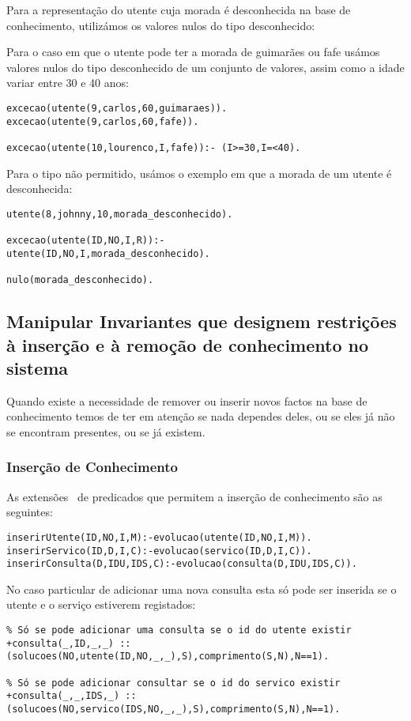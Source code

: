 Para a representação do utente cuja morada é desconhecida na base de conhecimento, utilizámos os valores nulos do tipo desconhecido: 



Para o caso em que o utente pode ter a morada de guimarães ou fafe  usámos valores nulos do tipo desconhecido de um conjunto de valores, assim como a idade variar entre 30 e 40 anos: 

\begin{Verbatim}
excecao(utente(9,carlos,60,guimaraes)).
excecao(utente(9,carlos,60,fafe)).

excecao(utente(10,lourenco,I,fafe)):- (I>=30,I=<40).	
\end{Verbatim}

Para o tipo não permitido, usámos o exemplo em que a morada de um utente é desconhecida: 

\begin{verbatim}
utente(8,johnny,10,morada_desconhecido).

excecao(utente(ID,NO,I,R)):- 
utente(ID,NO,I,morada_desconhecido).

nulo(morada_desconhecido).
\end{verbatim}


\subsection{Manipular Invariantes que designem restrições à inserção e à remoção de conhecimento no sistema}

Quando existe a necessidade de remover ou inserir novos factos na base de conhecimento temos de ter em atenção se nada dependes deles, ou se eles já não se encontram presentes, ou se já existem. 

\subsubsection{Inserção de Conhecimento}
As extensões ~de predicados que permitem a inserção de conhecimento são as seguintes: 
\begin{verbatim}
inserirUtente(ID,NO,I,M):-evolucao(utente(ID,NO,I,M)).
inserirServico(ID,D,I,C):-evolucao(servico(ID,D,I,C)).
inserirConsulta(D,IDU,IDS,C):-evolucao(consulta(D,IDU,IDS,C)).
\end{verbatim}
No caso particular de adicionar uma nova consulta esta só pode ser inserida se o utente e o serviço estiverem registados: 
\begin{verbatim}
% Só se pode adicionar uma consulta se o id do utente existir 
+consulta(_,ID,_,_) ::
(solucoes(NO,utente(ID,NO,_,_),S),comprimento(S,N),N==1).

% Só se pode adicionar consultar se o id do servico existir
+consulta(_,_,IDS,_) ::
(solucoes(NO,servico(IDS,NO,_,_),S),comprimento(S,N),N==1).
\end{verbatim}


